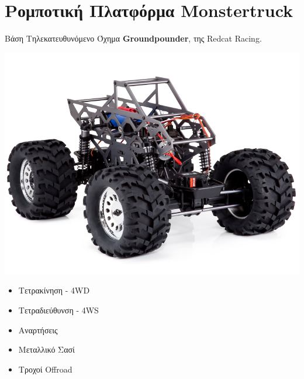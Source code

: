 \documentclass[10pt, compress, handout]{beamer} %
\begin{document}
\section{Ρομποτική Πλατφόρμα Monstertruck}

\begin{frame}{Βάση}
	Τηλεκατευθυνόμενο Όχημα \textbf{Groundpounder}, της Redcat Racing.\\[1cm]
	
	\begin{minipage}{0.55\textwidth}
		\includegraphics[width=\textwidth]{Figures/groundpounder.jpg}
	\end{minipage}
	\begin{minipage}{0.4\textwidth}
		\begin{itemize}
			\item Τετρακίνηση - 4WD
			\item Τετραδιεύθυνση - 4WS
			\item Αναρτήσεις
			\item Μεταλλικό Σασί
			\item Τροχοί Offroad
		\end{itemize}
	\end{minipage}
	
\end{frame}
\end{document}
